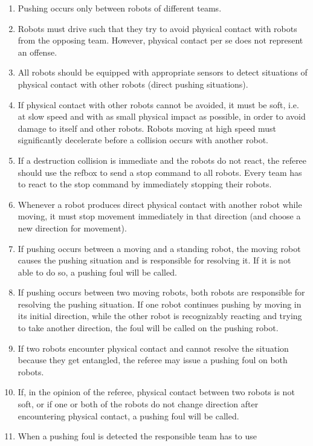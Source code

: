 \documentclass[12pt,twoside]{article}
\begin{document}
\begin{enumerate}
\item Pushing occurs only between robots of different teams.
\item Robots must drive such that they try to avoid physical contact
  with robots from the opposing team. However, physical contact per se
  does not represent an offense.
\item All robots should be equipped with appropriate sensors to detect
  situations of physical contact with other robots (direct pushing
  situations).
\item If physical contact with other robots cannot be avoided, it must
  be soft, i.e. at slow speed and with as small physical impact as
  possible, in order to avoid damage to itself and other
  robots. Robots moving at high speed must significantly decelerate
  before a collision occurs with another robot.
\item If a destruction collision is immediate and the robots do not
  react, the referee should use the refbox to send a stop command to
  all robots. Every team has to react to the stop command by
  immediately stopping their robots.
\item Whenever a robot produces direct physical contact with another
  robot while moving, it must stop movement immediately in that
  direction (and choose a new direction for movement).
\item If pushing occurs between a moving and a standing robot, the
  moving robot causes the pushing situation and is responsible for
  resolving it. If it is not able to do so, a pushing foul will be
  called.
\item If pushing occurs between two moving robots, both robots are
  responsible for resolving the pushing situation. If one robot
  continues pushing by moving in its initial direction, while the
  other robot is recognizably reacting and trying to take another
  direction, the foul will be called on the pushing robot.
\item If two robots encounter physical contact and cannot resolve the
  situation because they get entangled, the referee may issue a
  pushing foul on both robots.
\item If, in the opinion of the referee, physical contact between two
  robots is not soft, or if one or both of the robots do not change
  direction after encountering physical contact, a pushing foul will
  be called.
\item When a pushing foul is detected the responsible team has to use

\end{enumerate}
\end{document}
